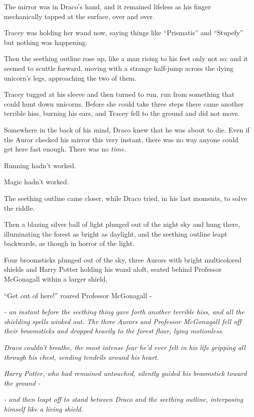The mirror was in Draco's hand, and it remained lifeless as his finger
mechanically tapped at the surface, over and over.

Tracey was holding her wand now, saying things like ``Prismatis'' and
``Stupefy'' but nothing was happening.

Then the seething outline rose up, like a man rising to his feet only
not so; and it seemed to scuttle forward, moving with a strange
half-jump across the dying unicorn's legs, approaching the two of them.

Tracey tugged at his sleeve and then turned to run, run from something
that could hunt down unicorns. Before she could take three steps there
came another terrible hiss, burning his ears, and Tracey fell to the
ground and did not move.

Somewhere in the back of his mind, Draco knew that he was about to die.
Even if the Auror checked his mirror this very instant, there was no way
anyone could get here fast enough. There was no \emph{time.}

Running hadn't worked.

Magic hadn't worked.

The seething outline came closer, while Draco tried, in his last
moments, to solve the riddle.

Then a blazing silver ball of light plunged out of the night sky and
hung there, illuminating the forest as bright as daylight, and the
seething outline leapt backwards, as though in horror of the light.

Four broomsticks plunged out of the sky, three Aurors with bright
multicolored shields and Harry Potter holding his wand aloft, seated
behind Professor McGonagall within a larger shield.

``Get out of here!'' roared Professor McGonagall -

\emph{- an instant before the seething thing gave forth another terrible
hiss, and all the shielding spells winked out. The three Aurors and
Professor McGonagall fell off their broomsticks and dropped heavily to
the forest floor, lying motionless.}

\emph{Draco couldn't breathe, the most intense fear he'd ever felt in
his life gripping all through his chest, sending tendrils around his
heart.}

\emph{Harry Potter, who had remained untouched, silently guided his
broomstick toward the ground -}

\emph{- and then leapt off to stand between Draco and the seething
outline, interposing himself like a living shield.}

